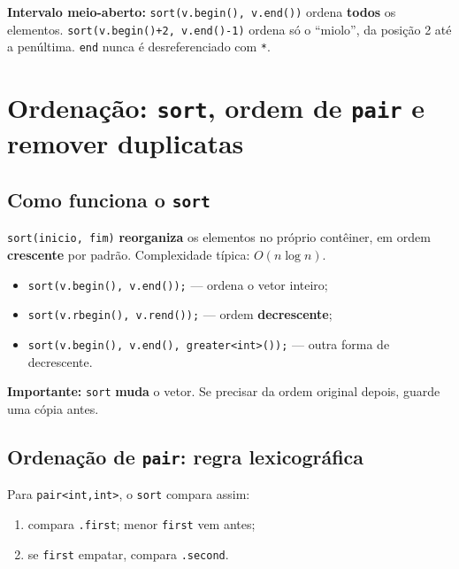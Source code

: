 \begin{exemplodiabox}
\textbf{Intervalo meio-aberto:} \texttt{sort(v.begin(), v.end())} ordena \textbf{todos} os elementos. \texttt{sort(v.begin()+2, v.end()-1)} ordena só o ``miolo'', da posição 2 até a penúltima. \texttt{end} nunca é desreferenciado com \texttt{*}.
\end{exemplodiabox}


\section{Ordenação: \texttt{sort}, ordem de \texttt{pair} e remover duplicatas}

\subsection{Como funciona o \texttt{sort}}

\texttt{sort(inicio, fim)} \textbf{reorganiza} os elementos no próprio contêiner, em ordem \textbf{crescente} por padrão.
Complexidade típica: $O(n \log n)$.

\begin{itemize}[nosep]
  \item \texttt{sort(v.begin(), v.end());} --- ordena o vetor inteiro;
  \item \texttt{sort(v.rbegin(), v.rend());} --- ordem \textbf{decrescente};
  \item \texttt{sort(v.begin(), v.end(), greater<int>());} --- outra forma de decrescente.
\end{itemize}

\textbf{Importante:} \texttt{sort} \textbf{muda} o vetor. Se precisar da ordem original depois, guarde uma cópia antes.

\subsection{Ordenação de \texttt{pair}: regra lexicográfica}

Para \texttt{pair<int,int>}, o \texttt{sort} compara assim:

\begin{enumerate}[nosep]
  \item compara \texttt{.first}; menor \texttt{first} vem antes;
  \item se \texttt{first} empatar, compara \texttt{.second}.
\end{enumerate}

